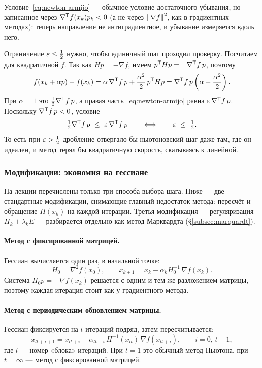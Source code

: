 \begin{idea}[title={Почему $\eps \le \tfrac12$}]
Условие~\eqref{eq:newton-armijo} — обычное условие достаточного убывания, но
записанное через $\nabla^{\mathsf{T}} f(x_k) p_k < 0$ (а не через $\left\lVert \nabla f \right\rVert^2$,
как в градиентных методах): теперь направление не антиградиентное, и убывание
измеряется вдоль него.

Ограничение $\eps \le \tfrac12$ нужно, чтобы единичный шаг проходил проверку.
Посчитаем для квадратичной $f$. Так как $H p = -\nabla f$, имеем
$p^{\mathsf{T}} H p = -\nabla^{\mathsf{T}} f\, p$, поэтому
\[
  f(x_k + \alpha p) - f(x_k)
  = \alpha\,\nabla^{\mathsf{T}} f\, p + \frac{\alpha^2}{2}\, p^{\mathsf{T}} H p
  = \nabla^{\mathsf{T}} f\, p \left(\alpha - \frac{\alpha^2}{2}\right) .
\]
При $\alpha = 1$ это $\tfrac12 \nabla^{\mathsf{T}} f\, p$, а правая
часть~\eqref{eq:newton-armijo} равна $\varepsilon\,\nabla^{\mathsf{T}} f\, p$. Поскольку
$\nabla^{\mathsf{T}} f\, p < 0$, условие
\[
  \tfrac12 \nabla^{\mathsf{T}} f\, p \ \le\ \varepsilon\,\nabla^{\mathsf{T}} f\, p
  \qquad\Longleftrightarrow\qquad
  \varepsilon \ \le\ \tfrac12 .
\]
То есть при $\varepsilon > \tfrac12$ дробление отвергало бы ньютоновский шаг даже
там, где он идеален, и метод терял бы квадратичную скорость, скатываясь к
линейной.
\end{idea}

\subsubsection*{Модификации: экономия на гессиане}

\begin{idea}[title={Откуда этот материал}]
На лекции перечислены только три способа выбора шага. Ниже — две стандартные
модификации, снимающие главный недостаток метода: пересчёт и обращение $H(x_k)$
на каждой итерации. Третья модификация — регуляризация
$H_k + \lambda_k E$ — разбирается отдельно как метод Марквардта
(\S\ref{subsec:marquardt}).
\end{idea}

\paragraph{Метод с фиксированной матрицей.}
Гессиан вычисляется один раз, в начальной точке:
\[
  H_0 = \nabla^2 f(x_0) ,
  \qquad
  x_{k+1} = x_k - \alpha_k H_0^{-1}\, \nabla f(x_k) .
\]
Система $H_0 p = -\nabla f(x_k)$ решается с одним и тем же разложением
матрицы, поэтому каждая итерация стоит как у градиентного метода.

\paragraph{Метод с периодическим обновлением матрицы.}
Гессиан фиксируется на $t$ итераций подряд, затем пересчитывается:
\[
  x_{lt+i+1} = x_{lt+i} - \alpha_{lt+i}\, H^{-1}(x_{lt})\, \nabla f(x_{lt+i}) ,
  \qquad i = \overline{0,\,t-1} ,
\]
где $l$ — номер «блока» итераций. При $t = 1$ это обычный метод Ньютона, при
$t = \infty$ — метод с фиксированной матрицей.

